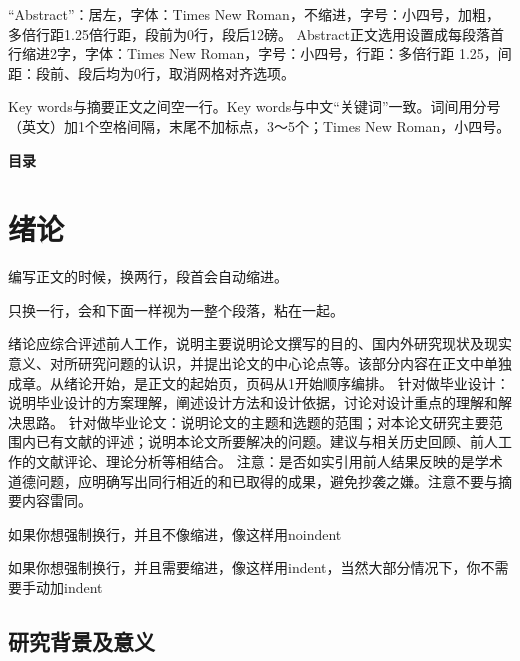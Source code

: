 \documentclass[UTF8,twoside]{ctexrep}
\begin{document}
“Abstract”：居左，字体：Times New Roman，不缩进，字号：小四号，加粗，多倍行距1.25倍行距，段前为0行，段后12磅。
Abstract正文选用设置成每段落首行缩进2字，字体：Times New Roman，字号：小四号，行距：多倍行距 1.25，间距：段前、段后均为0行，取消网格对齐选项。

Key words与摘要正文之间空一行。Key words与中文“关键词”一致。词间用分号（英文）加1个空格间隔，末尾不加标点，3～5个；Times New Roman，小四号。


\EnglishAbstractTextFinish



\clearpage
\begin{center}
  {\songti{}\bfseries 目录}
\end{center}
\vspace{1.5em}

\makeatletter
{}
\makeatother


\clearpage
{}
\ThesisBodyStyle


\chapter{绪论}
编写正文的时候，换两行，段首会自动缩进。

只换一行，会和下面一样视为一整个段落，粘在一起。

绪论应综合评述前人工作，说明主要说明论文撰写的目的、国内外研究现状及现实意义、对所研究问题的认识，并提出论文的中心论点等。该部分内容在正文中单独成章。从绪论开始，是正文的起始页，页码从1开始顺序编排。
针对做毕业设计：说明毕业设计的方案理解，阐述设计方法和设计依据，讨论对设计重点的理解和解决思路。
针对做毕业论文：说明论文的主题和选题的范围；对本论文研究主要范围内已有文献的评述；说明本论文所要解决的问题。建议与相关历史回顾、前人工作的文献评论、理论分析等相结合。
注意：是否如实引用前人结果反映的是学术道德问题，应明确写出同行相近的和已取得的成果，避免抄袭之嫌。注意不要与摘要内容雷同。


\noindent 如果你想强制换行，并且不像缩进，像这样用noindent


\indent 如果你想强制换行，并且需要缩进，像这样用indent，当然大部分情况下，你不需要手动加indent


\section{研究背景及意义}
\end{document}
